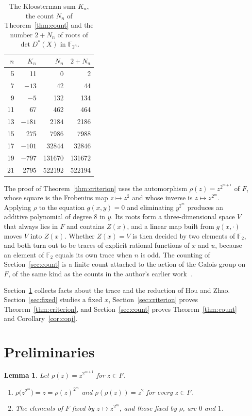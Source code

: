 \documentclass[11pt,a4paper,reqno]{amsart}
\newtheorem{lemma}[theorem]{Lemma}
\theoremstyle{remark}
\numberwithin{equation}{section}
\newcommand{\F}{\mathbb{F}}
\begin{document}
\begin{table}[ht]
\caption{The Kloosterman sum $K_n$, the count $N_n$ of Theorem~\ref{thm:count} and the number $2+N_n$ of roots of $\det D^*(X)$ in $\F_{2^n}$.}\label{tab}
\centering
\begin{tabular}{rrrr}
\toprule
$n$ & $K_n$ & $N_n$ & $2+N_n$\\
\midrule
5 & 11 & 0 & 2\\
7 & $-13$ & 42 & 44\\
9 & $-5$ & 132 & 134\\
11 & 67 & 462 & 464\\
13 & $-181$ & 2184 & 2186\\
15 & 275 & 7986 & 7988\\
17 & $-101$ & 32844 & 32846\\
19 & $-797$ & 131670 & 131672\\
21 & 2795 & 522192 & 522194\\
\bottomrule
\end{tabular}
\end{table}

The proof of Theorem~\ref{thm:criterion} uses the automorphism $\rho(z)=z^{2^{m+1}}$ of $F$, whose square is the Frobenius map $z\mapsto z^2$ and whose inverse is $z\mapsto z^{2^m}$. Applying $\rho$ to the equation $g(x,y)=0$ and eliminating $y^{2^m}$ produces an additive polynomial of degree $8$ in $y$. Its roots form a three-dimensional space $V$ that always lies in $F$ and contains $Z(x)$, and a linear map built from $g(x,\cdot)$ moves $V$ into $Z(x)$. Whether $Z(x)=V$ is then decided by two elements of $\F_2$, and both turn out to be traces of explicit rational functions of $x$ and $u$, because an element of $\F_2$ equals its own trace when $n$ is odd. The counting of Section~\ref{sec:count} is a finite count attached to the action of the Galois group on $F$, of the same kind as the counts in the author's earlier work~\cite{Bha22a,Bha22b,BB26}.

Section~\ref{sec:prelim} collects facts about the trace and the reduction of Hou and Zhao. Section~\ref{sec:fixed} studies a fixed $x$, Section~\ref{sec:criterion} proves Theorem~\ref{thm:criterion}, and Section~\ref{sec:count} proves Theorem~\ref{thm:count} and Corollary~\ref{cor:conj}.

\section{Preliminaries}\label{sec:prelim}

\begin{lemma}\label{lem:frob}
Let $\rho(z)=z^{2^{m+1}}$ for $z\in F$.
\begin{enumerate}
\item[(a)] $\rho\bigl(z^{2^m}\bigr)=z=\rho(z)^{2^m}$ and $\rho(\rho(z))=z^2$ for every $z\in F$.
\item[(b)] The elements of $F$ fixed by $z\mapsto z^{2^m}$, and those fixed by $\rho$, are $0$ and $1$.
\end{enumerate}
\end{lemma}
\end{document}
